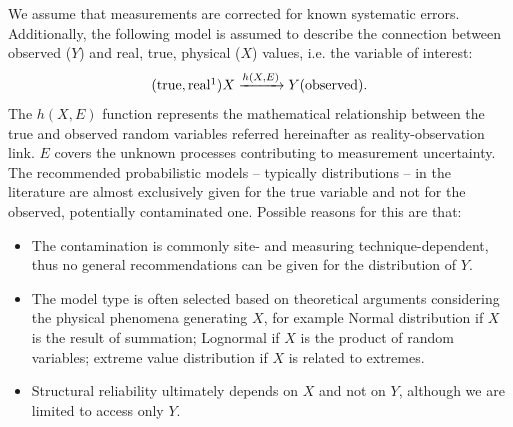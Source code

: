 We assume that measurements are corrected for known systematic errors. Additionally, the following model is assumed to describe the connection between observed ($Y$) and real, true, physical ($X$) values, i.e. the variable of interest:
\begin{equation}
\label{eq:ro_link}
	\mathrm{(true, real\footnotemark)} X \xrightarrow[]{h(X,E)} Y \mathrm{(observed)}.
\end{equation}
The $h(X, E)$ function represents the mathematical relationship between the true and observed random variables referred hereinafter as reality-observation link. $E$ covers the unknown processes contributing to measurement uncertainty. The recommended probabilistic models -- typically distributions -- in the literature are almost exclusively given for the true variable and not for the observed, potentially contaminated one. Possible reasons for this are that:
\begin{itemize}
	\item The contamination is commonly site- and measuring technique-dependent, thus no general recommendations can be given for the distribution of $Y$.
	\item The model type is often selected based on theoretical arguments considering the physical phenomena generating $X$, for example Normal distribution if $X$ is the result of summation; Lognormal if $X$ is the product of random variables; extreme value distribution if $X$ is related to extremes.
	\item Structural reliability ultimately depends on $X$ and not on $Y$, although we are limited to access only $Y$.
\end{itemize}

